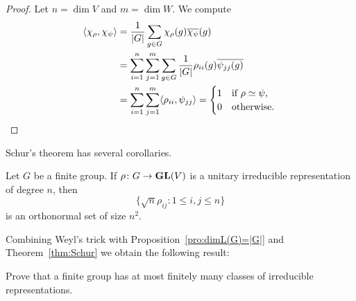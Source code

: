 \begin{proof}
    Let $n=\dim V$ and $m=\dim W$. We compute
    \begin{align*}
        \langle\chi_\rho,\chi_\psi\rangle
        &=\frac{1}{|G|}\sum_{g\in G}\chi_\rho(g)\overline{\chi_\psi}(g)\\
        &=\sum_{i=1}^n\sum_{j=1}^m\sum_{g\in G}\frac{1}{|G|}\rho_{ii}(g)\overline{\psi_{jj}(g)}\\
        &=\sum_{i=1}^n\sum_{j=1}^m\langle \rho_{ii},\psi_{jj}\rangle
        =\begin{cases}
            1 & \text{if $\rho\simeq\psi$,}\\
            0 & \text{otherwise.}
        \end{cases}\qedhere
    \end{align*}
\end{proof}

Schur's theorem has several 
corollaries.

\begin{exercise}
Let $G$ be a finite group. 
If $\rho\colon G\to\mathbf{GL}(V)$ is a unitary irreducible representation
of degree $n$, then
\[
\{\sqrt{n}\rho_{ij}:1\leq i,j\leq n\}
\]
is an orthonormal set of size $n^2$.
\end{exercise}


Combining Weyl's trick with Proposition~\ref{pro:dimL(G)=|G|}
and Theorem~\ref{thm:Schur} 
we obtain the following result: 


\begin{exercise}
     Prove that a finite group has at most 
     finitely many classes of irreducible representations. 
\end{exercise}

